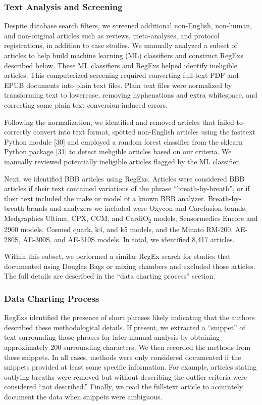 \documentclass[
  letterpaper,
  DIV=11,
  numbers=noendperiod]{scrartcl}
\begin{document}
\subsubsection{Text Analysis and
Screening}\label{text-analysis-and-screening}

Despite database search filters, we screened additional non-English,
non-human, and non-original articles such as reviews, meta-analyses, and
protocol registrations, in addition to case studies. We manually
analyzed a subset of articles to help build machine learning (ML)
classifiers and construct RegExs described below. These ML classifiers
and RegExs helped identify ineligible articles. This computerized
screening required converting full-text PDF and EPUB documents into
plain text files. Plain text files were normalized by transforming text
to lowercase, removing hyphenations and extra whitespace, and correcting
some plain text conversion-induced errors.

Following the normalization, we identified and removed articles that
failed to correctly convert into text format, spotted non-English
articles using the fasttext Python module {[}30{]} and employed a random
forest classifier from the sklearn Python package {[}31{]} to detect
ineligible articles based on our criteria. We manually reviewed
potentially ineligible articles flagged by the ML classifier.

Next, we identified BBB articles using RegExs. Articles were considered
BBB articles if their text contained variations of the phrase
``breath-by-breath'', or if their text included the make or model of a
known BBB analyzer. Breath-by-breath brands and analyzers we included
were Oxycon and Carefusion brands, Medgraphics Ultima, CPX, CCM, and
CardiO\textsubscript{2} models, Sensormedics Encore and 2900 models,
Cosmed quark, k4, and k5 models, and the Minato RM-200, AE-280S,
AE-300S, and AE-310S models. In total, we identified 8,417 articles.

Within this subset, we performed a similar RegEx search for studies that
documented using Douglas Bags or mixing chambers and excluded those
articles. The full details are described in the ``data charting
process'' section.

\subsubsection{Data Charting Process}\label{data-charting-process}

RegExs identified the presence of short phrases likely indicating that
the authors described these methodological details. If present, we
extracted a ``snippet'' of text surrounding those phrases for later
manual analysis by obtaining approximately 200 surrounding characters.
We then recorded the methods from these snippets. In all cases, methods
were only considered documented if the snippets provided at least some
specific information. For example, articles stating outlying breaths
were removed but without describing the outlier criteria were considered
``not described.'' Finally, we read the full-text article to accurately
document the data when snippets were ambiguous.
\end{document}
